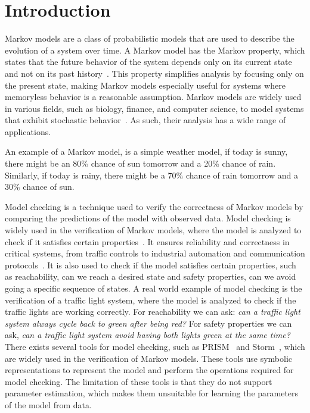 \section{Introduction}\label{sec:introduction}
Markov models are a class of probabilistic models that are used to describe the evolution of a system over time. 
A Markov model has the Markov property, which states that the future behavior of the system depends only on its current state and not on its past history~\cite{markov1962theory}.
This property simplifies analysis by focusing only on the present state, making Markov models especially useful for systems where memoryless behavior is a reasonable assumption.
Markov models are widely used in various fields, such as biology, finance, and computer science, to model systems that exhibit stochastic behavior~\cite{covid19_prism,ciocchetta2009bio, mamon2007hidden,lazowska1984quantitative}.
As such, their analysis has a wide range of applications.

An example of a Markov model, is a simple weather model, if today is sunny, there might be an 80\% chance of sun tomorrow and a 20\% chance of rain. Similarly, if today is rainy, there might be a 70\% chance of rain tomorrow and a 30\% chance of sun.

Model checking is a technique used to verify the correctness of Markov models by comparing the predictions of the model with observed data.
Model checking is widely used in the verification of Markov models, where the model is analyzed to check if it satisfies certain properties~\cite{clarke1997model}. 
It ensures reliability and correctness in critical systems, from traffic controls to industrial automation and communication protocols~\cite{clarke1997model}.
It is also used to check if the model satisfies certain properties, such as reachability, can we reach a desired state and safety properties, can we avoid going a specific sequence of states.
A real world example of model checking is the verification of a traffic light system, where the model is analyzed to check if the traffic lights are working correctly.
For reachability we can ask: \textit{can a traffic light system always cycle back to green after being red?}
For safety properties we can ask, \textit{can a traffic light system avoid having both lights green at the same time?}
There exists several tools for model checking, such as PRISM~\cite{kwiatkowska2011prism} and Storm~\cite{hensel2021probabilistic}, which are widely used in the verification of Markov models. 
These tools use symbolic representations to represent the model and perform the operations required for model checking.
The limitation of these tools is that they do not support parameter estimation, which makes them unsuitable for learning the parameters of the model from data.

